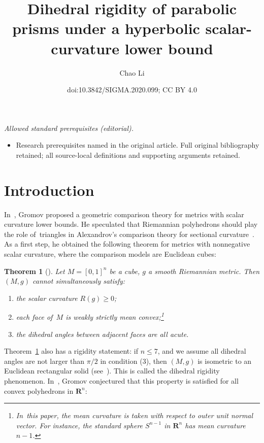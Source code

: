 \documentclass[10pt,a4paper]{amsart}
\title{Dihedral rigidity of parabolic prisms under a hyperbolic scalar-curvature lower bound}
\author{Chao Li}
\date{doi:10.3842/SIGMA.2020.099; CC BY 4.0}
\numberwithin{equation}{section}
\newtheorem{theo}[prop]{Theorem}
\theoremstyle{definition}
\newcommand{\RR}{\mathbf{R}}
\begin{document}
\maketitle
\noindent\textit{Allowed standard prerequisites (editorial).}\begin{itemize}
\item Research prerequisites named in the original article. Full original bibliography retained; all source-local definitions and supporting arguments retained.
\end{itemize}\medskip
\section{Introduction}
In~\cite{Gromov2014Dirac}, Gromov proposed a geometric comparison theory for metrics with scalar curvature lower bounds. He speculated that Riemannian polyhedrons should play the role of~triangles in Alexandrov's comparison theory for sectional curvature~\cite{AleksandrovRerestovskiiNikolaev86}. As a first step, he obtained the following theorem for metrics with nonnegative scalar curvature, where the comparison models are Euclidean cubes:

\begin{theo}[\cite{Gromov2014Dirac}]\label{theo.cube.nonrigit}
Let $M=[0,1]^n$ be a cube, $g$ a smooth Riemannian metric. Then $(M,g)$ cannot simultaneously satisfy:
\begin{enumerate}\itemsep=0pt
\item[${\rm 1)}$] the scalar curvature $R(g)\ge 0$;
\item[${\rm 2)}$] each face of~$M$ is weakly strictly mean convex;\footnote{In~this paper, the mean curvature is taken with respect to outer unit normal vector. For instance, the standard sphere $S^{n-1}$ in $\RR^n$ has mean curvature $n-1$.}
\item[${\rm 3)}$] the dihedral angles between adjacent faces are all acute.
\end{enumerate}
\end{theo}

Theorem~\ref{theo.cube.nonrigit} also has a rigidity statement: if $n\le 7$, and we assume all dihedral angles are not larger than $\pi/2$ in condition (3), then $(M,g)$ is isometric to an Euclidean rectangular solid (see~\cite{Li2017polyhedron,li2019dihedral}). This is called the dihedral rigidity phenomenon. In~\cite{Gromov2014Dirac,Gromov2018Adozen}, Gromov conjectured that this property is satisfied for all convex polyhedrons in $\RR^n$:
\end{document}
